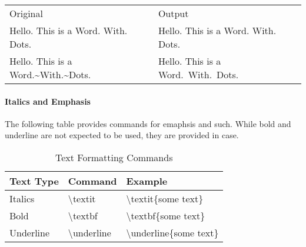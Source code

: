 \documentclass{nzlaw}
\newcommand{\s}{\textbackslash}
\begin{document}
\begin{tabular}{l l}
Original & Output \\
Hello. This is a Word. With. Dots. & Hello. This is a Word. With. Dots. \\

Hello. This is a Word.{\textasciitilde}With.{\textasciitilde}Dots. &Hello. This is a Word.~With.~Dots.
\end{tabular}

\paragraph{Italics and Emphasis}
The following table provides commands for emaphsis and such. While bold and underline are not expected to be used, they are provided in case.

\begin{table}[H]
\centering
\begin{tabular}{|l|l|l|}
\hline
Text Type & Command & Example \\ \hline
Italics & {\s}textit  & {\s}textit\{some text\}\\
Bold & {\s}textbf  & {\s}textbf\{some text\}\\
Underline & {\s}underline & {\s}underline\{some text\} \\
\hline
\end{tabular}
\caption{Text Formatting Commands}
\end{table}
\end{document}
